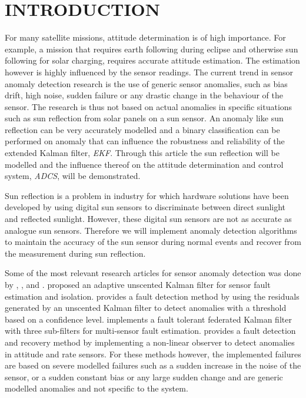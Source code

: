 \documentclass[letterpaper, 10 pt, conference]{ieeeconf}  %
\begin{document}
\section{INTRODUCTION}
For many satellite missions, attitude determination is of high importance. For example, a mission that requires earth following during eclipse and otherwise sun following for solar charging, requires accurate attitude estimation. The estimation however is highly influenced by the sensor readings. The current trend in sensor anomaly detection research is the use of generic sensor anomalies, such as bias drift, high noise, sudden failure or any drastic change in the behaviour of the sensor. The research is thus not based on actual anomalies in specific situations such as sun reflection from solar panels on a sun sensor. An anomaly like sun reflection can be very accurately modelled and a binary classification can be performed on anomaly that can influence the robustness and reliability of the extended Kalman filter, \emph{EKF}. Through this article the sun reflection will be modelled and the influence thereof on the attitude determination and control system, \emph{ADCS}, will be demonstrated.

Sun reflection is a problem in industry for which hardware solutions have been developed by using digital sun sensors to discriminate between direct sunlight and reflected sunlight. However, these digital sun sensors are not as accurate as analogue sun sensors. Therefore we will implement anomaly detection algorithms to maintain the accuracy of the sun sensor during normal events and recover from the measurement during sun reflection.

Some of the most relevant research articles for sensor anomaly detection was done by \textcite{wang2019adaptive}, \textcite{Xiong2007}, \textcite{Zhou2016} and \textcite{Nasrolahi2018}. \textcite{wang2019adaptive} proposed an adaptive unscented Kalman filter for sensor fault estimation and isolation. \textcite{Xiong2007} provides a fault detection method by using the residuals generated by an unscented Kalman filter to detect anomalies with a threshold based on a confidence level. \textcite{Zhou2016} implements a fault tolerant federated Kalman filter with three sub-filters for multi-sensor fault estimation. \textcite{Nasrolahi2018} provides a fault detection and recovery method by implementing a non-linear observer to detect anomalies in attitude and rate sensors. For these methods however, the implemented failures are based on severe modelled failures such as a sudden increase in the noise of the sensor, or a sudden constant bias or any large sudden change and are generic modelled anomalies and not specific to the system. 
\end{document}
